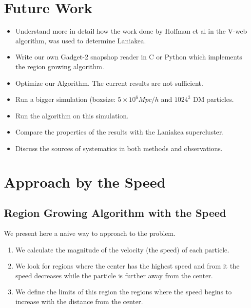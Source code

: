 \documentclass[12pt]{article}
\begin{document}
\section{Future Work}
\begin{itemize}
	\item Understand more in detail how the work done by Hoffman et al\cite{hoffman_kinematic_2012} in the V-web algorithm, was used to determine Laniakea.
    \item Write our own Gadget-2 snapshop reader in C or Python which implements the region growing algorithm.
    \item Optimize our Algorithm. The current results are not sufficient.
    \item Run a bigger simulation (boxsize: $5 \times 10^{6} Mpc/h$ and $1024^3$ DM particles.
    \item Run the algorithm on this simulation.
    \item Compare the properties of the results with the Laniakea supercluster.
    \item Discuss the sources of systematics in both methods and observations.
\end{itemize}






\appendix
\section{Approach by the Speed} \label{App:App_Speed}
\subsection{Region Growing Algorithm with the Speed}

We present here a naive way to approach to the problem. 
\begin{enumerate}
	\item We calculate the magnitude of the velocity (the speed) of each particle. 
	\item We look for regions where the center has the highest speed and from it the speed decreases while the particle is further away from the center. 
    \item We define the limits of this region the regions where the speed begins to increase with the distance from the center.
\end{enumerate}
\end{document}
